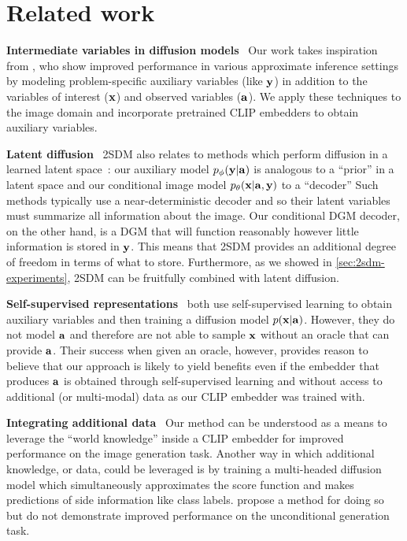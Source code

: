 \section{Related work}
\textbf{Intermediate variables in diffusion models}~
 Our work takes inspiration from \citet{weilbach2022graphically}, %
who show improved performance in various approximate inference settings by modeling problem-specific auxiliary variables (like ${\mathbf{y}}$) in addition to the variables of interest (${\mathbf{x}}$) and observed variables (${\mathbf{a}}$). We apply these techniques to the image domain and incorporate pretrained CLIP embedders to obtain auxiliary variables. 

\textbf{Latent diffusion}~
2SDM also relates to methods which perform diffusion in a learned latent space~\citep{rombach2022high}: our auxiliary model $p_\phi({\mathbf{y}}|{\mathbf{a}})$ is analogous to a ``prior'' in a latent space and our conditional image model $p_\theta({\mathbf{x}}|{\mathbf{a}},{\mathbf{y}})$ to a ``decoder'' Such methods typically use a near-deterministic decoder and so their latent variables must summarize all information about the image. Our conditional DGM decoder, on the other hand, is a DGM that will function reasonably however little information is stored in ${\mathbf{y}}$. This means that 2SDM provides an additional degree of freedom in terms of what to store. Furthermore, as we showed in \cref{sec:2sdm-experiments}, 2SDM can be fruitfully combined with latent diffusion.

\textbf{Self-supervised representations}~
\citet{bao2022conditional,hu2022self} both use self-supervised learning to obtain auxiliary variables and then training a diffusion model $p({\mathbf{x}}|{\mathbf{a}})$. However, they do not model ${\mathbf{a}}$ and therefore are not able to sample ${\mathbf{x}}$ without an oracle that can provide ${\mathbf{a}}$. Their success when given an oracle, however, provides reason to believe that our approach is likely to yield benefits even if the embedder that produces ${\mathbf{a}}$ is obtained through self-supervised learning and without access to additional (or multi-modal) data as our CLIP embedder was trained with.

\textbf{Integrating additional data}~
Our method can be understood as a means to leverage the ``world knowledge'' inside a CLIP embedder for improved performance on the image generation task. Another way in which additional knowledge, or data, could be leveraged is by training a multi-headed diffusion model which simultaneously approximates the score function and makes predictions of side information like class labels. \citet{deja2023learning} propose a method for doing so but do not demonstrate improved performance on the unconditional generation task.

